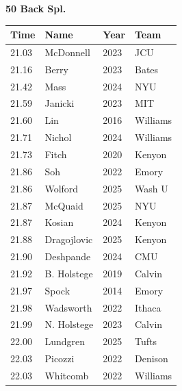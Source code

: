 \noindent\begin{minipage}[t]{0.98\textwidth}
\centering
\textbf{\textcolor{teamprimary}{50 Back Spl.}}\par
\vspace{0.5em}
\centering
\small
\renewcommand{\arraystretch}{1.0}
\setlength{\tabcolsep}{4pt}
\begin{tabular}{@{}p{2.5cm}p{4.5cm}p{1.5cm}p{2.5cm}@{}}
\toprule
\textbf{Time} & \textbf{Name} & \textbf{Year} & \textbf{Team} \\
\midrule
21.03 & McDonnell & 2023 & JCU \\
21.16 & Berry & 2023 & Bates \\
21.42 & Mass & 2024 & NYU \\
21.59 & Janicki & 2023 & MIT \\
21.60 & Lin & 2016 & Williams \\
21.71 & Nichol & 2024 & Williams \\
21.73 & Fitch & 2020 & Kenyon \\
21.86 & Soh & 2022 & Emory \\
21.86 & Wolford & 2025 & Wash U \\
21.87 & McQuaid & 2025 & NYU \\
21.87 & Kosian & 2024 & Kenyon \\
21.88 & Dragojlovic & 2025 & Kenyon \\
21.90 & Deshpande & 2024 & CMU \\
21.92 & B. Holstege & 2019 & Calvin \\
21.97 & Spock & 2014 & Emory \\
21.98 & Wadsworth & 2022 & Ithaca \\
21.99 & N. Holstege & 2023 & Calvin \\
22.00 & Lundgren & 2025 & Tufts \\
22.03 & Picozzi & 2022 & Denison \\
22.03 & Whitcomb & 2022 & Williams \\
\bottomrule
\end{tabular}
\end{minipage}
\vspace{1.2em}
